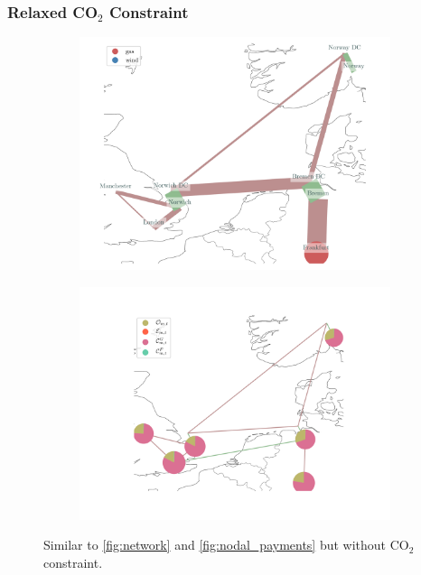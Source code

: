 \documentclass[11pt]{article}
\begin{document}
\newpage
\subsubsection*{Relaxed CO$_2$ Constraint}


\begin{figure}[h]
\begin{subfigure}{.5\textwidth}
\centering
 \includegraphics[width=\textwidth]{network_relaxed_co2.png}
 \caption{}
 \label{fig:network_relaxed_co2}
\end{subfigure}
\begin{subfigure}{.5\textwidth}   
    \centering
    \includegraphics[width=\textwidth]{nodal_payments_relaxed_co2.png}
    \caption{}
    \label{fig:nodal_payments_relaxed_co2}
\end{subfigure}
\caption{Similar to \cref{fig:network} and \cref{fig:nodal_payments} but without CO$_2$ constraint.}
\end{figure}
\end{document}
